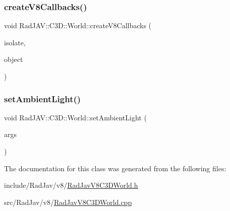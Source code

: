 \mbox{\label{class_rad_j_a_v_1_1_c3_d_1_1_world_a4c68947e89d23a07544266cc70fceb36}} 
\subsubsection{\texorpdfstring{create\+V8\+Callbacks()}{createV8Callbacks()}}
{\footnotesize\ttfamily void Rad\+J\+A\+V\+::\+C3\+D\+::\+World\+::create\+V8\+Callbacks (\begin{DoxyParamCaption}\item[{v8\+::\+Isolate $\ast$}]{isolate,  }\item[{v8\+::\+Local$<$ v8\+::\+Object $>$}]{object }\end{DoxyParamCaption})\hspace{0.3cm}{\ttfamily [static]}}

\mbox{\label{class_rad_j_a_v_1_1_c3_d_1_1_world_abb9f8b9d6390178578356fa1a214dbf8}} 
\subsubsection{\texorpdfstring{set\+Ambient\+Light()}{setAmbientLight()}}
{\footnotesize\ttfamily void Rad\+J\+A\+V\+::\+C3\+D\+::\+World\+::set\+Ambient\+Light (\begin{DoxyParamCaption}\item[{const v8\+::\+Function\+Callback\+Info$<$ v8\+::\+Value $>$ \&}]{args }\end{DoxyParamCaption})\hspace{0.3cm}{\ttfamily [static]}}



The documentation for this class was generated from the following files\+:\begin{DoxyCompactItemize}
\item 
include/\+Rad\+Jav/v8/\mbox{\hyperlink{_rad_jav_v8_c3_d_world_8h}{Rad\+Jav\+V8\+C3\+D\+World.\+h}}\item 
src/\+Rad\+Jav/v8/\mbox{\hyperlink{_rad_jav_v8_c3_d_world_8cpp}{Rad\+Jav\+V8\+C3\+D\+World.\+cpp}}\end{DoxyCompactItemize}
